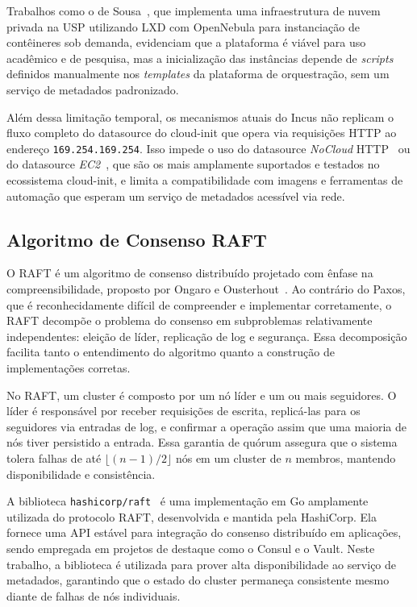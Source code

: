 Trabalhos como o de Sousa~\citeyearpar{sousa2018computacao}, que implementa uma infraestrutura de nuvem privada na USP utilizando LXD com OpenNebula para instanciação de contêineres sob demanda, evidenciam que a plataforma é viável para uso acadêmico e de pesquisa, mas a inicialização das instâncias depende de \textit{scripts} definidos manualmente nos \textit{templates} da plataforma de orquestração, sem um serviço de metadados padronizado.

Além dessa limitação temporal, os mecanismos atuais do Incus não replicam o fluxo completo do datasource do cloud-init que opera via requisições HTTP ao endereço \texttt{169.254.169.254}. Isso impede o uso do datasource \textit{NoCloud} HTTP~\citep{cloudinit_nocloud} ou do datasource \textit{EC2}~\citep{cloudinit_ec2_ds}, que são os mais amplamente suportados e testados no ecossistema cloud-init, e limita a compatibilidade com imagens e ferramentas de automação que esperam um serviço de metadados acessível via rede.

\subsection{Algoritmo de Consenso RAFT}

O RAFT é um algoritmo de consenso distribuído projetado com ênfase na compreensibilidade, proposto por Ongaro e Ousterhout~\citeyearpar{ongaro2014raft}. Ao contrário do Paxos, que é reconhecidamente difícil de compreender e implementar corretamente, o RAFT decompõe o problema do consenso em subproblemas relativamente independentes: eleição de líder, replicação de log e segurança. Essa decomposição facilita tanto o entendimento do algoritmo quanto a construção de implementações corretas.

No RAFT, um cluster é composto por um nó líder e um ou mais seguidores. O líder é responsável por receber requisições de escrita, replicá-las para os seguidores via entradas de log, e confirmar a operação assim que uma maioria de nós tiver persistido a entrada. Essa garantia de quórum assegura que o sistema tolera falhas de até $\lfloor(n-1)/2\rfloor$ nós em um cluster de $n$ membros, mantendo disponibilidade e consistência.

A biblioteca \texttt{hashicorp/raft}~\citep{hashicorp_raft} é uma implementação em Go amplamente utilizada do protocolo RAFT, desenvolvida e mantida pela HashiCorp. Ela fornece uma API estável para integração do consenso distribuído em aplicações, sendo empregada em projetos de destaque como o Consul e o Vault. Neste trabalho, a biblioteca é utilizada para prover alta disponibilidade ao serviço de metadados, garantindo que o estado do cluster permaneça consistente mesmo diante de falhas de nós individuais.

